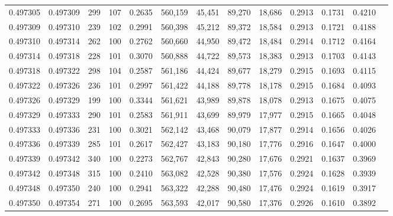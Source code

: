 \begin{tabular}{rrrrrrrrrrrrr}
0.497305 & 0.497309 &   299 & 107 &                                     0.2635 & 560,159 &  45,451 &  89,270 &  18,686 & 0.2913 & 0.1731 & 0.4210 \\
0.497309 & 0.497310 &   239 & 102 &                                     0.2991 & 560,398 &  45,212 &  89,372 &  18,584 & 0.2913 & 0.1721 & 0.4188 \\
0.497310 & 0.497314 &   262 & 100 &                                     0.2762 & 560,660 &  44,950 &  89,472 &  18,484 & 0.2914 & 0.1712 & 0.4164 \\
0.497314 & 0.497318 &   228 & 101 &                                     0.3070 & 560,888 &  44,722 &  89,573 &  18,383 & 0.2913 & 0.1703 & 0.4143 \\
0.497318 & 0.497322 &   298 & 104 &                                     0.2587 & 561,186 &  44,424 &  89,677 &  18,279 & 0.2915 & 0.1693 & 0.4115 \\
0.497322 & 0.497326 &   236 & 101 &                                     0.2997 & 561,422 &  44,188 &  89,778 &  18,178 & 0.2915 & 0.1684 & 0.4093 \\
0.497326 & 0.497329 &   199 & 100 &                                     0.3344 & 561,621 &  43,989 &  89,878 &  18,078 & 0.2913 & 0.1675 & 0.4075 \\
0.497329 & 0.497333 &   290 & 101 &                                     0.2583 & 561,911 &  43,699 &  89,979 &  17,977 & 0.2915 & 0.1665 & 0.4048 \\
0.497333 & 0.497336 &   231 & 100 &                                     0.3021 & 562,142 &  43,468 &  90,079 &  17,877 & 0.2914 & 0.1656 & 0.4026 \\
0.497336 & 0.497339 &   285 & 101 &                                     0.2617 & 562,427 &  43,183 &  90,180 &  17,776 & 0.2916 & 0.1647 & 0.4000 \\
0.497339 & 0.497342 &   340 & 100 &                                     0.2273 & 562,767 &  42,843 &  90,280 &  17,676 & 0.2921 & 0.1637 & 0.3969 \\
0.497342 & 0.497348 &   315 & 100 &                                     0.2410 & 563,082 &  42,528 &  90,380 &  17,576 & 0.2924 & 0.1628 & 0.3939 \\
0.497348 & 0.497350 &   240 & 100 &                                     0.2941 & 563,322 &  42,288 &  90,480 &  17,476 & 0.2924 & 0.1619 & 0.3917 \\
0.497350 & 0.497354 &   271 & 100 &                                     0.2695 & 563,593 &  42,017 &  90,580 &  17,376 & 0.2926 & 0.1610 & 0.3892 \\

\end{tabular}
